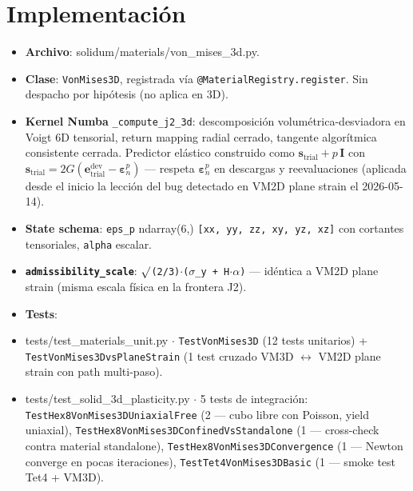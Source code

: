 \documentclass[11pt,letterpaper,oneside]{report}
\begin{document}
\section{Implementación}

\begin{itemize}
  \item \textbf{Archivo}: solidum/materials/von\_mises\_3d.py.
  \item \textbf{Clase}: \texttt{VonMises3D}, registrada vía \texttt{@MaterialRegistry.register}. Sin despacho por hipótesis (no aplica en 3D).
  \item \textbf{Kernel Numba} \texttt{\_compute\_j2\_3d}: descomposición volumétrica-desviadora en Voigt 6D tensorial, return mapping radial cerrado, tangente algorítmica consistente cerrada. Predictor elástico construido como $\mathbf s_\text{trial} + p\,\mathbf I$ con $\mathbf s_\text{trial} = 2G(\mathbf e^\text{dev}_\text{trial} - \boldsymbol\varepsilon^p_n)$ --- respeta $\boldsymbol\varepsilon^p_n$ en descargas y reevaluaciones (aplicada desde el inicio la lección del bug detectado en VM2D plane strain el 2026-05-14).
  \item \textbf{State schema}: \texttt{eps\_p} ndarray(6,) \texttt{[xx, yy, zz, xy, yz, xz]} con cortantes tensoriales, \texttt{alpha} escalar.
  \item \textbf{\texttt{admissibility\_scale}}: \texttt{\ensuremath{\surd}(2/3)\ensuremath{\cdot}(\ensuremath{\sigma}\_y + H\ensuremath{\cdot}\ensuremath{\alpha})} --- idéntica a VM2D plane strain (misma escala física en la frontera J2).
  \item \textbf{Tests}:
  \item tests/test\_materials\_unit.py \ensuremath{\cdot} \texttt{TestVonMises3D} (12 tests unitarios) + \texttt{TestVonMises3DvsPlaneStrain} (1 test cruzado VM3D \ensuremath{\leftrightarrow} VM2D plane strain con path multi-paso).
  \item tests/test\_solid\_3d\_plasticity.py \ensuremath{\cdot} 5 tests de integración: \texttt{TestHex8VonMises3DUniaxialFree} (2 --- cubo libre con Poisson, yield uniaxial), \texttt{TestHex8VonMises3DConfinedVsStandalone} (1 --- cross-check contra material standalone), \texttt{TestHex8VonMises3DConvergence} (1 --- Newton converge en pocas iteraciones), \texttt{TestTet4VonMises3DBasic} (1 --- smoke test Tet4 + VM3D).
\end{itemize}
\end{document}
